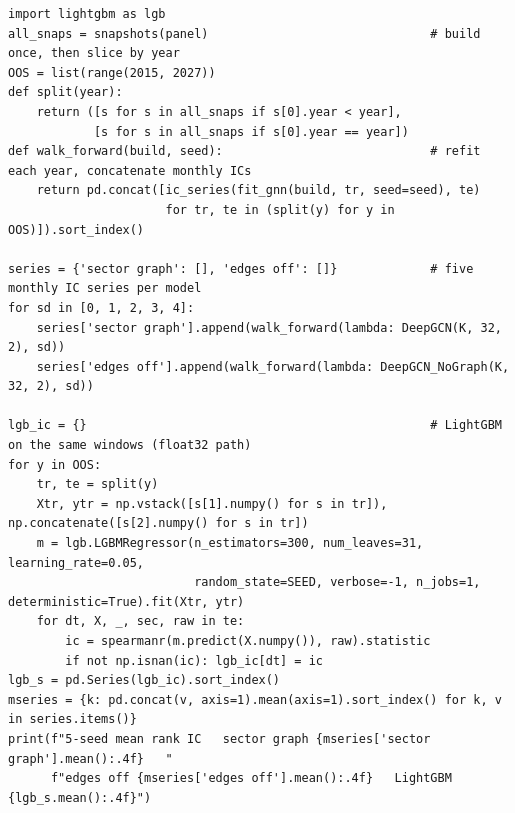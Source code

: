 \begin{verbatim}
import lightgbm as lgb
all_snaps = snapshots(panel)                               # build once, then slice by year
OOS = list(range(2015, 2027))
def split(year):
    return ([s for s in all_snaps if s[0].year < year],
            [s for s in all_snaps if s[0].year == year])
def walk_forward(build, seed):                             # refit each year, concatenate monthly ICs
    return pd.concat([ic_series(fit_gnn(build, tr, seed=seed), te)
                      for tr, te in (split(y) for y in OOS)]).sort_index()

series = {'sector graph': [], 'edges off': []}             # five monthly IC series per model
for sd in [0, 1, 2, 3, 4]:
    series['sector graph'].append(walk_forward(lambda: DeepGCN(K, 32, 2), sd))
    series['edges off'].append(walk_forward(lambda: DeepGCN_NoGraph(K, 32, 2), sd))

lgb_ic = {}                                                # LightGBM on the same windows (float32 path)
for y in OOS:
    tr, te = split(y)
    Xtr, ytr = np.vstack([s[1].numpy() for s in tr]), np.concatenate([s[2].numpy() for s in tr])
    m = lgb.LGBMRegressor(n_estimators=300, num_leaves=31, learning_rate=0.05,
                          random_state=SEED, verbose=-1, n_jobs=1, deterministic=True).fit(Xtr, ytr)
    for dt, X, _, sec, raw in te:
        ic = spearmanr(m.predict(X.numpy()), raw).statistic
        if not np.isnan(ic): lgb_ic[dt] = ic
lgb_s = pd.Series(lgb_ic).sort_index()
mseries = {k: pd.concat(v, axis=1).mean(axis=1).sort_index() for k, v in series.items()}
print(f"5-seed mean rank IC   sector graph {mseries['sector graph'].mean():.4f}   "
      f"edges off {mseries['edges off'].mean():.4f}   LightGBM {lgb_s.mean():.4f}")
\end{verbatim}


